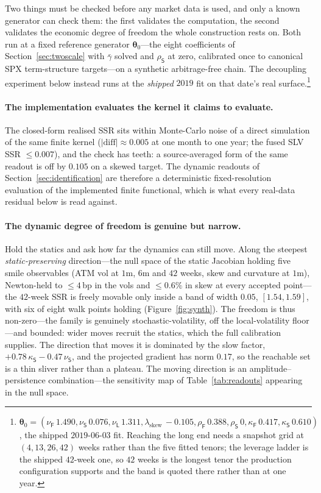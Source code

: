 \documentclass[11pt]{article}
\providecommand{\1}{\mathbf 1}
\newcommand{\bth}{{\boldsymbol{\theta}}}
\begin{document}
Two things must be checked before any market data is used, and only a known generator can check
them: the first validates the computation, the second validates the economic degree of freedom the
whole construction rests on. Both run at a fixed reference generator $\bth_0$---the eight
coefficients of Section~\ref{sec:twoscale} with $\bar\gamma$ solved and $\rho_{\mathsf S}$ at zero,
calibrated once to canonical SPX term-structure targets---on a synthetic arbitrage-free
chain. The decoupling experiment below instead runs at the \emph{shipped} $2019$ fit on that date's
real surface.\footnote{$\bth_0=(\nu_{\mathsf{F}}\,1.490,\nu_{\mathsf{S}}\,0.076,
\nu_{\mathsf{L}}\,1.311,\lambda_{\mathrm{skew}}\,{-}0.105,\rho_{\mathsf{F}}\,0.388,
\rho_{\mathsf{S}}\,0,\kappa_{\mathsf{F}}\,0.417,\kappa_{\mathsf{S}}\,0.610)$, the shipped
$2019$-$06$-$03$ fit. Reaching the long end needs a snapshot grid at
$(4,13,26,42)$ weeks rather than the five fitted tenors; the leverage ladder is the shipped
$42$-week one, so $42$ weeks is the longest tenor the production configuration supports and the band
is quoted there rather than at one year.}

\paragraph{The implementation evaluates the kernel it claims to evaluate.} The closed-form
realised SSR sits within Monte-Carlo noise of a direct simulation of the same finite kernel
($|\mathrm{diff}|\approx0.005$ at one month to one year; the fused SLV SSR $\le0.007$), and the check
has teeth: a source-averaged form of the same readout is off by $0.105$ on a skewed target. The
dynamic readouts of Section~\ref{sec:identification} are therefore a deterministic
fixed-resolution evaluation of the implemented finite functional, which is what
every real-data residual below is read against.

\paragraph{The dynamic degree of freedom is genuine but narrow.} Hold the statics and ask how far
the dynamics can still move. Along the steepest \emph{static-preserving} direction---the null space
of the static Jacobian holding five smile observables (ATM vol at $1$m, $6$m and $42$ weeks, skew and
curvature at $1$m), Newton-held to ${\le}4$\,bp in the vols and ${\le}0.6\%$ in skew at every
accepted point---the $42$-week SSR is freely movable only inside a band of width
$\mathbf{0.05}$, $[1.54,1.59]$, with six of eight walk points holding
(Figure~\ref{fig:synth}). The freedom is thus non-zero---the family is genuinely
stochastic-volatility, off the local-volatility floor---and bounded: wider moves recruit the
statics, which the full calibration supplies. The direction that moves it is dominated by the slow
factor, $+0.78\,\kappa_{\mathsf S}-0.47\,\nu_{\mathsf S}$, and the projected gradient has norm
$0.17$, so the reachable set is a thin sliver rather than a plateau. The moving direction is an
amplitude--persistence combination---the sensitivity map of Table~\ref{tab:readouts} appearing in
the null space.
\end{document}
